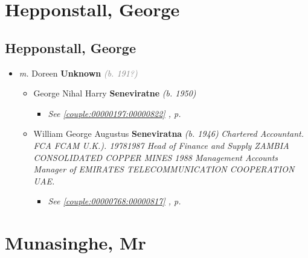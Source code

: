 \documentclass[10pt, openany]{book}
\begin{document}
\part{Hepponstall, George}
\chapter{Hepponstall, George}
\label{00000251}
\textcolor{slmaroon}{\textit{}}
\begin{itemize}
\item{\textit{m.} Doreen \textbf{Unknown} \textcolor{gray}{\textit{(b. 191?)}}   \label{couple:00000251:00000873} \begin{itemize}
\item{George Nihal Harry \textbf{Seneviratne} \textcolor{slorange}{\textit{(b. 1950)}}
\begin{itemize}
\item{\textcolor{slteal}{\textit{See  \autoref{couple:00000197:00000822} \textit{, p. \pageref{couple:00000197:00000822} }}}}
\end{itemize}
   }
\item{William George Augustus \textbf{Seneviratna} \textcolor{slorange}{\textit{(b. 1946)}} \textcolor{slmaroon}{\textit{Chartered Accountant.
FCA FCAM U.K.).
19781987 Head of Finance and Supply ZAMBIA CONSOLIDATED COPPER MINES 1988 Management Accounts Manager of EMIRATES TELECOMMUNICATION COOPERATION UAE.}}
\begin{itemize}
\item{\textcolor{slteal}{\textit{See  \autoref{couple:00000768:00000817} \textit{, p. \pageref{couple:00000768:00000817} }}}}
\end{itemize}
   }
\end{itemize}}
\end{itemize}
 
\part{Munasinghe, Mr}
\end{document}

